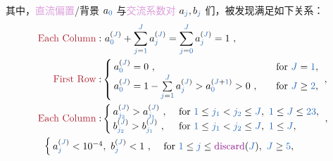 其中，\textcolor{Plum}{直流偏置}/背景 $a_{\textcolor{NavyBlue}{0}}$ 与\textcolor{Plum}{交流系数对} $a_{\textcolor{NavyBlue}{j}}, b_{\textcolor{NavyBlue}{j}}$ 们，被发现满足如下关系：
\begin{subequations}\label{eq:chord:abj-relations}
	\begin{align}
		\text{\textcolor{Maroon}{Each Column}}:& ~a_{\textcolor{NavyBlue}{0}}^{(\textcolor{NavyBlue}{J})}+\sum\limits_{\textcolor{NavyBlue}{j}=\textcolor{NavyBlue}{1}}^{\textcolor{NavyBlue}{J}}a_{\textcolor{NavyBlue}{j}}^{(\textcolor{NavyBlue}{J})}=\sum\limits_{\textcolor{NavyBlue}{j}=\textcolor{NavyBlue}{0}}^{\textcolor{NavyBlue}{J}}a_{\textcolor{NavyBlue}{j}}^{(\textcolor{NavyBlue}{J})}=1 \label{eq:chord:abj-relations-a}~,\\
		\text{\textcolor{Maroon}{First Row}}:
		&\begin{cases}
			a_{\textcolor{NavyBlue}{0}}^{(\textcolor{NavyBlue}{J})}=0~, &\quad \text{for }\textcolor{NavyBlue}{J}=\textcolor{NavyBlue}{1},\\
			a_{\textcolor{NavyBlue}{0}}^{(\textcolor{NavyBlue}{J})}=1-\sum\limits_{\textcolor{NavyBlue}{j}=\textcolor{NavyBlue}{1}}^{\textcolor{NavyBlue}{J}}a_{\textcolor{NavyBlue}{j}}^{(\textcolor{NavyBlue}{J})} > a_{\textcolor{NavyBlue}{0}}^{(\textcolor{NavyBlue}{J}+\textcolor{NavyBlue}{1})} > 0~, &\quad \text{for } \textcolor{NavyBlue}{J} \ge \textcolor{NavyBlue}{2},
		\end{cases}\label{eq:chord:abj-relations-b}~,\\
		\text{\textcolor{Maroon}{Each Column}}:
		&\begin{cases}
			a_{\textcolor{NavyBlue}{j_2}}^{(\textcolor{NavyBlue}{J})} >  a_{\textcolor{NavyBlue}{j_1}}^{(\textcolor{NavyBlue}{J})}~, &~ \text{for }\textcolor{NavyBlue}{1}\le \textcolor{NavyBlue}{j_1}<\textcolor{NavyBlue}{j_2}\le \textcolor{NavyBlue}{J},\ \textcolor{NavyBlue}{1}\le \textcolor{NavyBlue}{J}\le \textcolor{NavyBlue}{23},\\
			b_{\textcolor{NavyBlue}{j_2}}^{(\textcolor{NavyBlue}{J})} > b_{\textcolor{NavyBlue}{j_1}}^{(\textcolor{NavyBlue}{J})}~, &~ \text{for }\textcolor{NavyBlue}{1}\le \textcolor{NavyBlue}{j_1}<\textcolor{NavyBlue}{j_2}\le \textcolor{NavyBlue}{J},\ \textcolor{NavyBlue}{1}\le \textcolor{NavyBlue}{J} ,
		\end{cases}\label{eq:chord:abj-relations-c}~,\\
		&\hspace{-6em} \begin{cases}
			a_{\textcolor{NavyBlue}{j}}^{(\textcolor{NavyBlue}{J})}<10^{-4},\ b_{\textcolor{NavyBlue}{j}}^{(\textcolor{NavyBlue}{J})}<1~, &~ \text{for } \textcolor{NavyBlue}{1}\le \textcolor{NavyBlue}{j}\le \text{\textcolor{Plum}{discard}}(\textcolor{NavyBlue}{J}),\ \textcolor{NavyBlue}{J} \ge \textcolor{NavyBlue}{5},\\

\end{cases}
\end{align}
\end{subequations}
